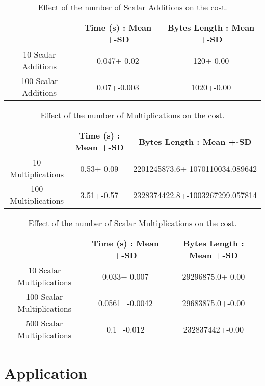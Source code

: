 \documentclass[10pt,conference,compsocconf]{IEEEtran}
\begin{document}
\begin{table}[h!]
\centering
\begin{tabular}{||c c c ||} 
 \hline
  & Time (s) : Mean +-SD & Bytes Length : Mean +-SD  \\ [0.5ex] 
 \hline\hline
 10 Scalar Additions & 0.047+-0.02 & 120+-0.00  \\
 100 Scalar Additions & 0.07+-0.003 & 1020+-0.00  \\ [1ex] 
 \hline
\end{tabular}
\caption{Effect of the number of Scalar Additions on the cost.}
\label{table:3}
\end{table}

\begin{table}[h!]
\centering
\begin{tabular}{||c c c ||} 
 \hline
  & Time (s) : Mean +-SD & Bytes Length : Mean +-SD  \\ [0.5ex] 
 \hline\hline
 10 Multiplications & 0.53+-0.09 & 2201245873.6+-1070110034.089642  \\
 100 Multiplications & 3.51+-0.57 & 2328374422.8+-1003267299.057814  \\ [1ex] 
 \hline
\end{tabular}
\caption{Effect of the number of Multiplications on the cost.}
\label{table:4}
\end{table}

\begin{table}[h!]
\centering
\begin{tabular}{||c c c ||} 
 \hline
  & Time (s) : Mean +-SD & Bytes Length : Mean +-SD  \\ [0.5ex] 
 \hline\hline
 10 Scalar Multiplications & 0.033+-0.007 & 29296875.0+-0.00  \\
 100 Scalar Multiplications & 0.0561+-0.0042 & 29683875.0+-0.00  \\
 500 Scalar Multiplications & 0.1+-0.012 & 232837442+-0.00  \\ [1ex] 
 \hline
\end{tabular}
\caption{Effect of the number of Scalar Multiplications on the cost.}
\label{table:5}
\end{table}


\section{Application}
\end{document}
